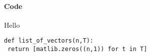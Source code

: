 \sudokuexampleone

\paragraph{Code}

Hello


\begin{lstlisting}
def list_of_vectors(n,T):
 return [matlib.zeros((n,1)) for t in T]
\end{lstlisting}

